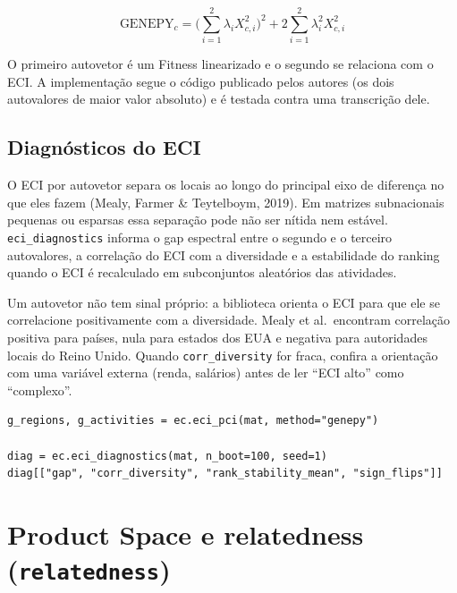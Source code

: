 \documentclass[12pt, a4paper]{article}
\newcommand{\fn}[1]{\texttt{#1}}
\begin{document}
\[
  \text{GENEPY}_c = \Big(\sum_{i=1}^{2} \lambda_i X_{c,i}^2\Big)^{2}
                    + 2 \sum_{i=1}^{2} \lambda_i^{2} X_{c,i}^{2}
\]

O primeiro autovetor \'{e} um Fitness linearizado e o segundo se relaciona
com o ECI. A implementa\c{c}\~{a}o segue o c\'{o}digo publicado pelos autores
(os dois autovalores de maior valor absoluto) e \'{e} testada contra uma
transcri\c{c}\~{a}o dele.

\subsection{Diagn\'{o}sticos do ECI}

\begin{sloppypar}
O ECI por autovetor separa os locais ao longo do principal eixo de
diferen\c{c}a no que eles fazem (Mealy, Farmer \& Teytelboym, 2019). Em
matrizes subnacionais pequenas ou esparsas essa separa\c{c}\~{a}o pode n\~{a}o
ser n\'{i}tida nem est\'{a}vel. \fn{eci\_diagnostics} informa o gap espectral
entre o segundo e o terceiro autovalores, a correla\c{c}\~{a}o do ECI com a
diversidade e a estabilidade do ranking quando o ECI \'{e} recalculado em
subconjuntos aleat\'{o}rios das atividades.
\end{sloppypar}

\begin{warnbox}
  Um autovetor n\~{a}o tem sinal pr\'{o}prio: a biblioteca orienta o ECI para
  que ele se correlacione positivamente com a diversidade. Mealy et al.\
  encontram correla\c{c}\~{a}o positiva para pa\'{i}ses, nula para estados
  dos EUA e negativa para autoridades locais do Reino Unido. Quando
  \texttt{corr\_diversity} for fraca, confira a orienta\c{c}\~{a}o com uma
  vari\'{a}vel externa (renda, sal\'{a}rios) antes de ler ``ECI alto'' como
  ``complexo''.
\end{warnbox}

\begin{lstlisting}[caption={GENEPY e diagn\'{o}sticos do ECI}]
g_regions, g_activities = ec.eci_pci(mat, method="genepy")

diag = ec.eci_diagnostics(mat, n_boot=100, seed=1)
diag[["gap", "corr_diversity", "rank_stability_mean", "sign_flips"]]
\end{lstlisting}

\section{Product Space e relatedness (\texttt{relatedness})}
\end{document}

